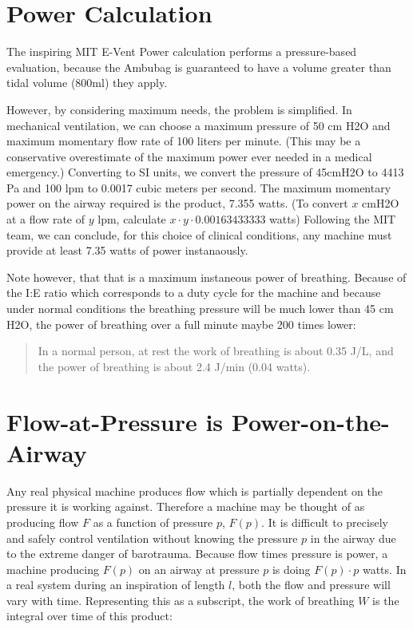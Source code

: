 \documentclass[conference]{article}
\begin{document}
\section{Power Calculation}

The inspiring MIT E-Vent Power calculation\cite{mitpowercalculation} performs
a pressure-based evaluation, because the Ambubag is guaranteed to have a volume greater than tidal volume (800ml) they apply.

However, by considering maximum needs, the problem is simplified. In mechanical ventilation,
we can choose a maximum pressure of 50 cm H2O and maximum momentary flow rate of 100 liters per minute.
(This may be a conservative overestimate of the maximum power ever needed in a medical emergency.)
Converting to SI units, we convert the pressure of 45cmH2O to 4413 Pa and 100 lpm to 0.0017 cubic meters per second.
The maximum momentary power on the airway required is the product, 7.355 watts.
(To convert $x$ cmH2O at a flow rate of $y$ lpm, calculate $x \cdot y \cdot 0.00163433333$ watts)
Following the MIT team, we can conclude, for this choice of clinical conditions, any
machine must provide at least 7.35 watts of power instanaously.

Note however, that that is a maximum instaneous power of breathing. Because of the I:E ratio which corresponds to a duty cycle for the machine
and because under normal
conditions the breathing pressure will be much lower than 45 cm H2O, the power of breathing over a full minute
maybe 200 times lower:
\begin{quote}
In a normal person, at rest the work of breathing is about 0.35 J/L, and the power of breathing is about 2.4 J/min (0.04 watts)\cite{mancebo1995comparative}.
\end{quote}

\section{Flow-at-Pressure is Power-on-the-Airway}

Any real physical machine produces flow which is partially dependent on the pressure it is working against.
Therefore a machine may be thought of as producing flow $F$ as a function of pressure $p$, $F(p)$.
It is difficult to precisely and safely control ventilation without knowing the
pressure $p$ in the airway  due to the extreme danger of barotrauma.
Because flow times pressure is power, a machine producing $F(p)$ on an airway at pressure $p$ is
doing $F(p) \cdot p$ watts. In a real system during an inspiration of length $l$, both the flow and pressure will
vary with time. Representing this as a subscript, the work of breathing $W$ is the integral over time
of this product:
\end{document}
